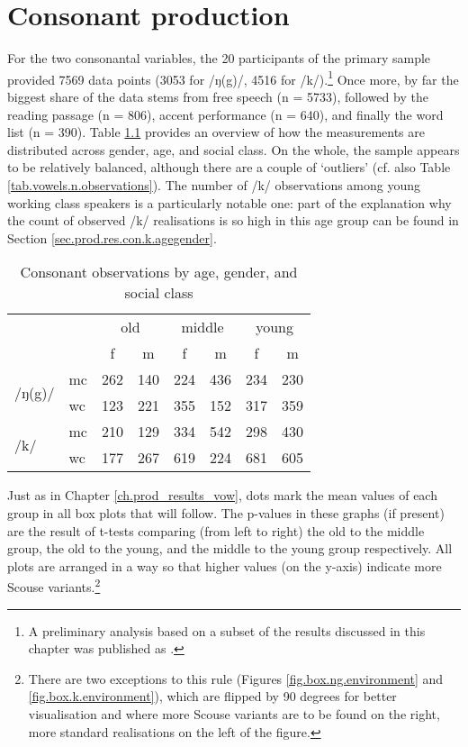 \chapter{Consonant production}
\label{prod.res.con}

For the two consonantal variables, the 20 participants of the primary sample provided 7569 data points (3053 for /ŋ(g)/, 4516 for /k/).\footnote{A preliminary analysis based on a subset of the results discussed in this chapter was published as \citealt{juskanaccentrevivallipp}.}
Once more, by far the biggest share of the data stems from free speech (n = 5733), followed by the reading passage (n = 806), accent performance (n = 640), and finally the word list (n = 390).
Table \ref{tab.consonants.n.observations} provides an overview of how the measurements are distributed across gender, age, and social class.
On the whole, the sample appears to be relatively balanced, although there are a couple of `outliers' (cf. also Table \ref{tab.vowels.n.observations}).
The number of /k/ observations among young working class speakers is a particularly notable one: part of the explanation why the count of observed /k/ realisations is so high in this age group can be found in Section \ref{sec.prod.res.con.k.agegender}.

\begin{table}[h!]
	\centering
	\caption{Consonant observations by age, gender, and social class}
	\label{tab.consonants.n.observations}
	\begin{tabular}{llcccccc}
		\hline
		\multicolumn{2}{c}{} & \multicolumn{2}{c}{old} & \multicolumn{2}{c}{middle} & \multicolumn{2}{c}{young}\\
		& & f & m & f & m & f & m\\
		\hline
		\multirow{2}{*}{/ŋ(g)/} & mc & 262 & 140 & 224 & 436 & 234 & 230\\
		& wc & 123 & 221 & 355 & 152 & 317 & 359\\
		\multirow{2}{*}{/k/} & mc & 210 & 129 & 334 & 542 & 298 & 430\\
		& wc & 177 & 267 & 619 & 224 & 681 & 605\\
		\hline
	\end{tabular}
\end{table}

Just as in Chapter \ref{ch.prod_results_vow}, dots mark the mean values of each group in all box plots that will follow.
The p-values in these graphs (if present) are the result of t-tests comparing (from left to right) the old to the middle group, the old to the young, and the middle to the young group respectively.
All plots are arranged in a way so that higher values (on the y-axis) indicate more Scouse variants.\footnote{There are two exceptions to this rule (Figures \ref{fig.box.ng.environment} and \ref{fig.box.k.environment}), which are flipped by 90 degrees for better visualisation and where more Scouse variants are to be found on the right, more standard realisations on the left of the figure.}



